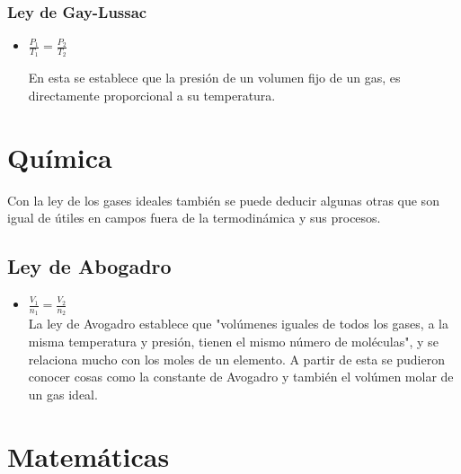 \documentclass[letterpaper, 12pt]{article}
\begin{document}
    \subsubsection*{Ley de Gay-Lussac} 
    
    \begin{itemize}
        \item[\textcolor{Simbolos}{\circledast}]$\frac{P_{1}}{T_{1}}=\frac{P_{2}}{T_{2}} $
    
    
    En esta se establece que la presión de un volumen fijo de un gas, es directamente proporcional a su temperatura. 
    \end{itemize}

\newpage

 \pagestyle{fancy}
            \fancyhf{}
            \cfoot{\thepage}

\section*{Química}

Con la ley de los gases ideales también se puede deducir algunas otras que son igual de útiles en campos fuera de la termodinámica y sus procesos.

\subsection*{Ley de Abogadro}


\begin{itemize}
    \item[\textcolor{Simbolos}{\otimes}] $\frac{V_{1}}{n_{1}} = \frac{V_{2}}{n_{2}}$\\

La ley de Avogadro establece que "volúmenes iguales de todos los gases, a la misma temperatura y presión, tienen el mismo número de moléculas", y se relaciona mucho con los moles de un elemento. A partir de esta se pudieron conocer cosas como la constante de Avogadro y también el volúmen molar de un gas ideal.

\end{itemize}

\newpage

 \pagestyle{fancy}
            \fancyhf{}
            \cfoot{\thepage}

\section*{Matemáticas}
\end{document}
